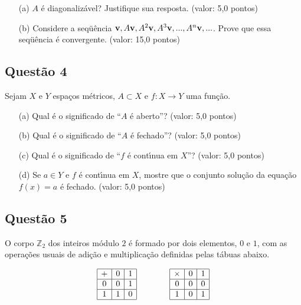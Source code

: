 \documentclass{report}
\begin{document}
\begin{enumerate}

\item[(a)] $A$ \'e diagonaliz\'avel? Justifique sua resposta. (valor: 5,0 pontos)

\item[(b)] Considere a seqü\^encia $\textbf v , A\textbf v , A^2\textbf v , A^3\textbf v , ... , A^n\textbf v , ... $. Prove que essa seqü\^encia \'e convergente. (valor: 15,0 pontos)

\end{enumerate}

\subsection{\color{blue} Quest\~ao 4}

Sejam $X$ e $Y$ espa\c cos m\'etricos, $A \subset X$ e $f: X \to Y$ uma fun\c c\~ao.

\begin{enumerate}

\item[(a)] Qual \'e o significado de “$A$ \'e aberto”? (valor: 5,0 pontos)

\item[(b)] Qual \'e o significado de “$A$ \'e fechado”? (valor: 5,0 pontos)

\item[(c)] Qual \'e o significado de “$f$ \'e cont\'\i nua em $X$”? (valor: 5,0 pontos)

\item[(d)] Se $a \in Y$ e $f$ \'e cont\'\i nua em $X$, mostre que o conjunto solu\c c\~ao da equa\c c\~ao $f(x) = a$ \'e fechado. (valor: 5,0 pontos)

\end{enumerate}

\subsection{\color{blue} Quest\~ao 5}

O corpo $\mathbb Z_2$ dos inteiros m\'odulo $2$ \'e formado por dois elementos, $0$ e $1$, com as opera\c c\~oes usuais de adi\c c\~ao e multiplica\c c\~ao definidas pelas t\'abuas abaixo.

$$\begin{array}{|c|c|c|}
\hline + & 0 & 1 \\
\hline 0 & 0 & 1 \\
\hline 1 & 1 & 0 \\
\hline
\end{array} \qquad \qquad
\begin{array}{|c|c|c|}
\hline \times & 0 & 1 \\
\hline 0 & 0 & 0 \\
\hline 1 & 0 & 1 \\
\hline
\end{array}$$
\end{document}
